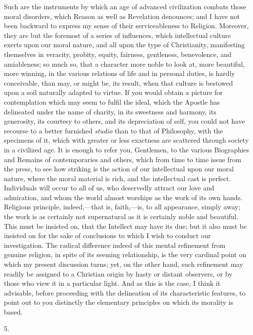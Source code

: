Such are the instruments by which an age of advanced civilization
combats those moral disorders, which Reason as well as Revelation
denounces; and I have not been backward to express my sense of their
serviceableness to Religion. Moreover, they are but the foremost of a
series of influences, which intellectual culture exerts upon our moral
nature, and all upon the type of Christianity, manifesting themselves
in veracity, probity, equity, fairness, gentleness, benevolence, and
amiableness; so much so, that a character more noble to look at, more
beautiful, more winning, in the various relations of life and in
personal duties, is hardly conceivable, than may, or might be, its
result, when that culture is bestowed upon a soil naturally
adapted to virtue. If you would obtain a picture for contemplation
which may seem to fulfil the ideal, which the Apostle has delineated
under the name of charity, in its sweetness and harmony, its
generosity, its courtesy to others, and its depreciation of self, you
could not have recourse to a better furnished \emph{studio} than to
that of Philosophy, with the specimens of it, which with greater or
less exactness are scattered through society in a civilized age. It is
enough to refer you, Gentlemen, to the various Biographies and Remains
of contemporaries and others, which from time to time issue from the
press, to see how striking is the action of our intellectual upon our
moral nature, where the moral material is rich, and the intellectual
cast is perfect. Individuals will occur to all of us, who deservedly
attract our love and admiration, and whom the world almost worships as
the work of its own hands. Religious principle, indeed,—that is,
faith,—is, to all appearance, simply away; the work is as certainly
not supernatural as it is certainly noble and beautiful. This must be
insisted on, that the Intellect may have its due; but it also must be
insisted on for the sake of conclusions to which I wish to conduct our
investigation. The radical difference indeed of this mental refinement
from genuine religion, in spite of its seeming relationship, is the
very cardinal point on which my present discussion turns; yet, on the
other hand, such refinement may readily be assigned to a Christian
origin by hasty or distant observers, or by those who view it in a
particular light. And as this is the case, I think it advisable,
before proceeding with the delineation of its characteristic features,
to point out to you distinctly the elementary principles on which its
morality is based.

5.

